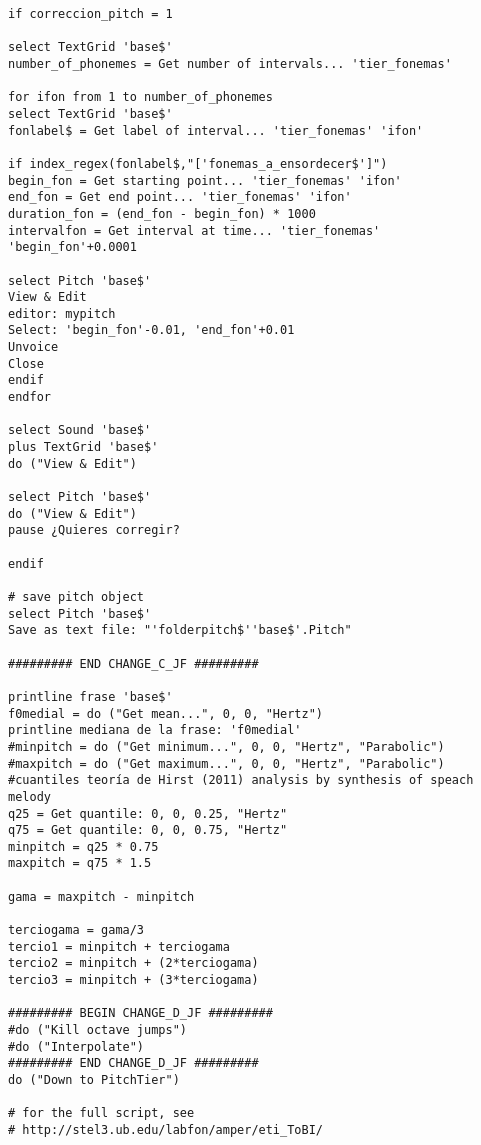 \begin{lstlisting}
if correccion_pitch = 1

select TextGrid 'base$'
number_of_phonemes = Get number of intervals... 'tier_fonemas'

for ifon from 1 to number_of_phonemes
select TextGrid 'base$'
fonlabel$ = Get label of interval... 'tier_fonemas' 'ifon'

if index_regex(fonlabel$,"['fonemas_a_ensordecer$']")
begin_fon = Get starting point... 'tier_fonemas' 'ifon'
end_fon = Get end point... 'tier_fonemas' 'ifon'
duration_fon = (end_fon - begin_fon) * 1000
intervalfon = Get interval at time... 'tier_fonemas' 'begin_fon'+0.0001

select Pitch 'base$'
View & Edit
editor: mypitch
Select: 'begin_fon'-0.01, 'end_fon'+0.01
Unvoice
Close
endif
endfor

select Sound 'base$'
plus TextGrid 'base$'
do ("View & Edit")

select Pitch 'base$'
do ("View & Edit")
pause ¿Quieres corregir? 

endif

# save pitch object
select Pitch 'base$'
Save as text file: "'folderpitch$''base$'.Pitch"

######### END CHANGE_C_JF #########

printline frase 'base$'
f0medial = do ("Get mean...", 0, 0, "Hertz")
printline mediana de la frase: 'f0medial'
#minpitch = do ("Get minimum...", 0, 0, "Hertz", "Parabolic")
#maxpitch = do ("Get maximum...", 0, 0, "Hertz", "Parabolic")
#cuantiles teoría de Hirst (2011) analysis by synthesis of speach melody
q25 = Get quantile: 0, 0, 0.25, "Hertz"
q75 = Get quantile: 0, 0, 0.75, "Hertz"
minpitch = q25 * 0.75
maxpitch = q75 * 1.5

gama = maxpitch - minpitch

terciogama = gama/3
tercio1 = minpitch + terciogama
tercio2 = minpitch + (2*terciogama)
tercio3 = minpitch + (3*terciogama)

######### BEGIN CHANGE_D_JF ######### 
#do ("Kill octave jumps")
#do ("Interpolate")
######### END CHANGE_D_JF #########
do ("Down to PitchTier")

# for the full script, see 
# http://stel3.ub.edu/labfon/amper/eti_ToBI/
\end{lstlisting}
